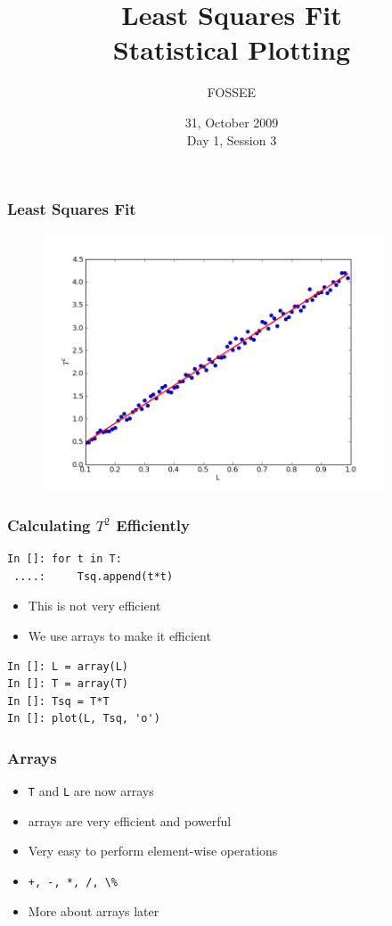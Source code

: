 \documentclass[14pt,compress]{beamer}
\title[]{Least Squares Fit\\Statistical Plotting}
\author[FOSSEE] {FOSSEE}
\institute[IIT Bombay] {Department of Aerospace Engineering\\IIT Bombay}
\date[] {31, October 2009\\Day 1, Session 3}
\newcommand{\typ}[1]{\lstinline{#1}}
\begin{document}
\begin{frame}
  \maketitle
\end{frame}


\begin{frame}[fragile]
\frametitle{Least Squares Fit}
\vspace{-0.15in}
\begin{figure}
\includegraphics[width=4in]{data/least-sq-fit.png}
\end{figure}
\end{frame}

\begin{frame}[fragile]
\frametitle{Calculating $T^2$ Efficiently}
\begin{lstlisting}
In []: for t in T:
 ....:     Tsq.append(t*t)
\end{lstlisting}
\begin{itemize}
\item This is not very efficient
\item We use arrays to make it efficient
\end{itemize}
\begin{lstlisting}
In []: L = array(L)
In []: T = array(T)
In []: Tsq = T*T
In []: plot(L, Tsq, 'o')
\end{lstlisting}
\end{frame}

\begin{frame}[fragile]
\frametitle{Arrays}
\begin{itemize}
\item \typ{T} and \typ{L} are now arrays
\item arrays are very efficient and powerful 
\item Very easy to perform element-wise operations
\item \typ{+, -, *, /, \%}
\item More about arrays later
\end{itemize}
\end{frame}
\end{document}
